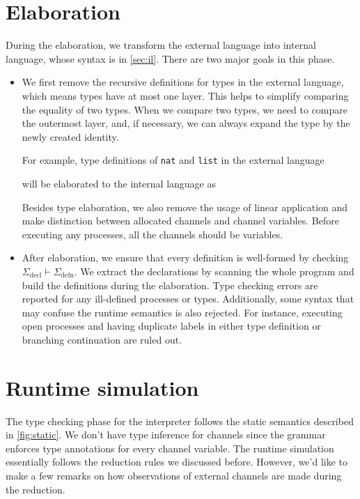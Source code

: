 \documentclass[12pt, openany]{memoir}
\begin{document}
\section{Elaboration}
During the elaboration, we transform the external language into internal language, whose syntax is in \cref{sec:il}. There are two major goals in this phase.
\begin{itemize}
  \item We first remove the recursive definitions for types in the external language, which means types have at most one layer.
  This helps to simplify comparing the equality of two types. When we compare two types, we need to compare the outermost layer,
  and, if necessary, we can always expand the type by the newly created identity.

  For example, type definitions of \texttt{nat} and \texttt{list} in the external language 
  
  will be elaborated to the internal language as
  
  Besides type elaboration, we also remove the usage of linear application and make distinction between allocated channels and channel variables.
  Before executing any processes, all the channels should be variables.
  \item After elaboration, we ensure that every definition is well-formed by checking $\Sigma_\text{decl} \vdash \Sigma_\text{defn}$. 
  We extract the declarations by scanning the whole program and build the definitions during the elaboration. 
  Type checking errors are reported for any ill-defined processes or types. 
  Additionally, some syntax that may confuse the runtime semantics is also rejected. 
  For instance, executing open processes and having duplicate labels in either type definition or branching continuation are ruled out.
\end{itemize}
\section{Runtime simulation}
The type checking phase for the interpreter follows the static semantics described in \cref{fig:static}. 
We don't have type inference for channels since the grammar enforces type annotations for every channel variable. 
The runtime simulation essentially follows the reduction rules we discussed before. 
However, we'd like to make a few remarks on how observations of external channels are made during the reduction.
\end{document}
